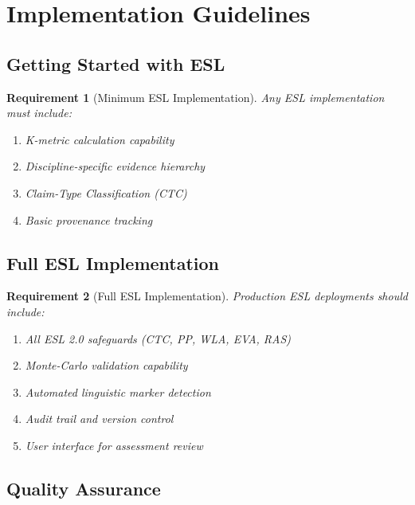 \documentclass[11pt,a4paper]{article}
\newtheorem{requirement}{Requirement}[section]
\theoremstyle{remark}
\begin{document}
\section{Implementation Guidelines}
\label{sec:implementation}

\subsection{Getting Started with ESL}

\begin{requirement}[Minimum ESL Implementation]
\label{req:minimum}
Any ESL implementation must include:
\begin{enumerate}
    \item K-metric calculation capability
    \item Discipline-specific evidence hierarchy
    \item Claim-Type Classification (CTC)
    \item Basic provenance tracking
\end{enumerate}
\end{requirement}

\subsection{Full ESL Implementation}

\begin{requirement}[Full ESL Implementation]
\label{req:full}
Production ESL deployments should include:
\begin{enumerate}
    \item All ESL 2.0 safeguards (CTC, PP, WLA, EVA, RAS)
    \item Monte-Carlo validation capability
    \item Automated linguistic marker detection
    \item Audit trail and version control
    \item User interface for assessment review
\end{enumerate}
\end{requirement}

\subsection{Quality Assurance}
\end{document}
